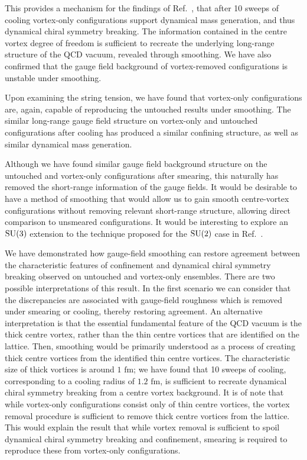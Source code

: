 \documentclass[
 reprint,
 amsmath,amssymb,
 aps,
prd,
]{revtex4-1}
\begin{document}
This provides a mechanism for the findings of Ref.~\cite{Trewartha:2015nna}, that after 10 sweeps of cooling vortex-only configurations support dynamical mass generation, and thus dynamical chiral symmetry breaking. The information contained in the centre vortex degree of freedom is sufficient to recreate the underlying long-range structure of the QCD vacuum, revealed through smoothing. We have also confirmed that the gauge field background of vortex-removed configurations is unstable under smoothing. \par 
Upon examining the string tension, we have found that vortex-only configurations are, again, capable of reproducing the untouched results under smoothing. The similar long-range gauge field structure on vortex-only and untouched configurations after cooling has produced a similar confining structure, as well as similar dynamical mass generation.  \par
Although we have found similar gauge field background structure on the untouched and vortex-only configurations after smearing, this naturally has removed the short-range information of the gauge fields. It would be desirable to have a method of smoothing that would allow us to gain smooth centre-vortex configurations without removing relevant short-range structure, allowing direct comparison to unsmeared configurations. It would be interesting to explore an $\mathrm{SU}(3)$ extension to the technique proposed for the $\mathrm{SU}(2)$ case in Ref.~\cite{Hollwieser:2015koa}.

We have demonstrated how gauge-field smoothing can restore agreement
between the characteristic features of confinement and dynamical chiral
symmetry breaking observed on untouched and vortex-only ensembles. There
are two possible interpretations of this result. In the first scenario
we can consider that the discrepancies are associated with gauge-field
roughness which is removed under smearing or cooling, thereby restoring
agreement. An alternative interpretation is  that the essential
fundamental feature of the QCD vacuum is the thick centre vortex, rather
than the thin centre vortices that are identified on the lattice. Then,
smoothing would be primarily understood as a process of creating thick
centre vortices from the identified thin centre vortices. The
characteristic size of thick vortices is around $1\,\,\mathrm{fm}$; we
have found that 10 sweeps of cooling, corresponding to a cooling radius
of $1.2\,\,\mathrm{fm}$, is sufficient to recreate dynamical chiral
symmetry breaking from a centre vortex background. It is of note that
while vortex-only configurations consist only of thin centre vortices,
the vortex removal procedure is sufficient to remove thick centre
vortices from the lattice. This would explain the result that while
vortex removal is sufficient to spoil dynamical chiral symmetry breaking
and confinement, smearing is required to reproduce these from
vortex-only configurations.
\end{document}
